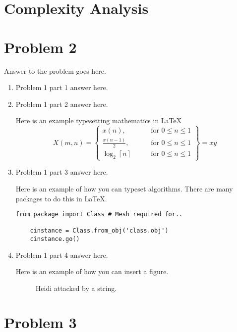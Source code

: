 \documentclass[12pt,letterpaper]{article}
\begin{document}
\section* {Complexity Analysis}

\section*{Problem 2}

Answer to the problem goes here.

\begin{enumerate}
  \item
   Problem 1 part 1 answer here.
  \item
    Problem 1 part 2 answer here.

    Here is an example typesetting mathematics in \LaTeX
\begin{equation*}
    X(m,n) = \left\{\begin{array}{lr}
        x(n), & \text{for } 0\leq n\leq 1\\
        \frac{x(n-1)}{2}, & \text{for } 0\leq n\leq 1\\
        \log_2 \left\lceil n \right\rceil \qquad & \text{for } 0\leq n\leq 1
        \end{array}\right\} = xy
\end{equation*}

    \item Problem 1 part 3 answer here.

    Here is an example of how you can typeset algorithms.
    There are many packages to do this in \LaTeX.
     
     \begin{lstlisting}[style = Python]
    from package import Class # Mesh required for..
    
    cinstance = Class.from_obj('class.obj')
    cinstance.go()
    \end{lstlisting}
     
  \item Problem 1 part 4 answer here.

    Here is an example of how you can insert a figure.
    \begin{figure}[!h]
    \centering
    \caption{Heidi attacked by a string.}
    \end{figure}
\end{enumerate}


\section*{Problem 3}
\end{document}
